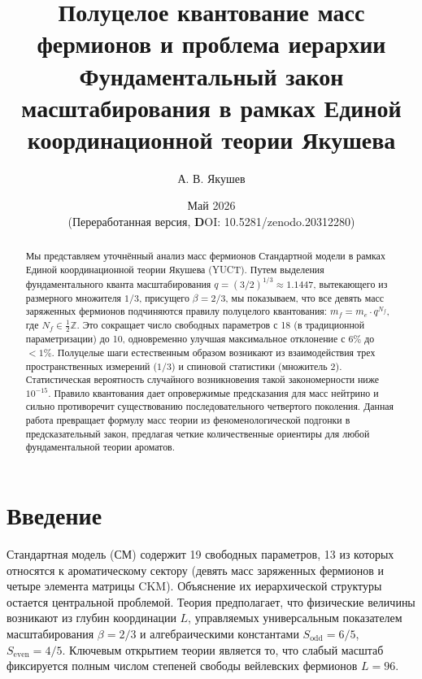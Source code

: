 \documentclass[12pt,a4paper]{article}
\begin{document}
	
	\title{Полуцелое квантование масс фермионов и проблема иерархии \\ 
		\large Фундаментальный закон масштабирования в рамках Единой координационной теории Якушева}
	\author{А. В. Якушев}
	\date{Май 2026 \\ (Переработанная версия, \textbf DOI: 10.5281/zenodo.20312280)}
	\maketitle
	
	\begin{abstract}
		Мы представляем уточнённый анализ масс фермионов Стандартной модели в рамках Единой координационной теории Якушева (YUCT). Путем выделения фундаментального кванта масштабирования $q = (3/2)^{1/3} \approx 1.1447$, вытекающего из размерного множителя $1/3$, присущего $\beta = 2/3$, мы показываем, что все девять масс заряженных фермионов подчиняются правилу полуцелого квантования: $m_f = m_e \cdot q^{N_f}$, где $N_f \in \frac{1}{2}\mathbb{Z}$. Это сокращает число свободных параметров с 18 (в традиционной параметризации) до 10, одновременно улучшая максимальное отклонение с 6\% до $<1\%$. Полуцелые шаги естественным образом возникают из взаимодействия трех пространственных измерений ($1/3$) и спиновой статистики (множитель 2). Статистическая вероятность случайного возникновения такой закономерности ниже $10^{-15}$. Правило квантования дает опровержимые предсказания для масс нейтрино и сильно противоречит существованию последовательного четвертого поколения. Данная работа превращает формулу масс теории из феноменологической подгонки в предсказательный закон, предлагая четкие количественные ориентиры для любой фундаментальной теории ароматов.
	\end{abstract}
	
	\section{Введение}
	
	Стандартная модель (СМ) содержит 19 свободных параметров, 13 из которых относятся к ароматическому сектору (девять масс заряженных фермионов и четыре элемента матрицы CKM). Объяснение их иерархической структуры остается центральной проблемой. Теория предполагает, что физические величины возникают из глубин координации $L$, управляемых универсальным показателем масштабирования $\beta = 2/3$ и алгебраическими константами $S_{\mathrm{odd}}=6/5$, $S_{\mathrm{even}}=4/5$. Ключевым открытием теории является то, что слабый масштаб фиксируется полным числом степеней свободы вейлевских фермионов $L=96$.
	
\end{document}

